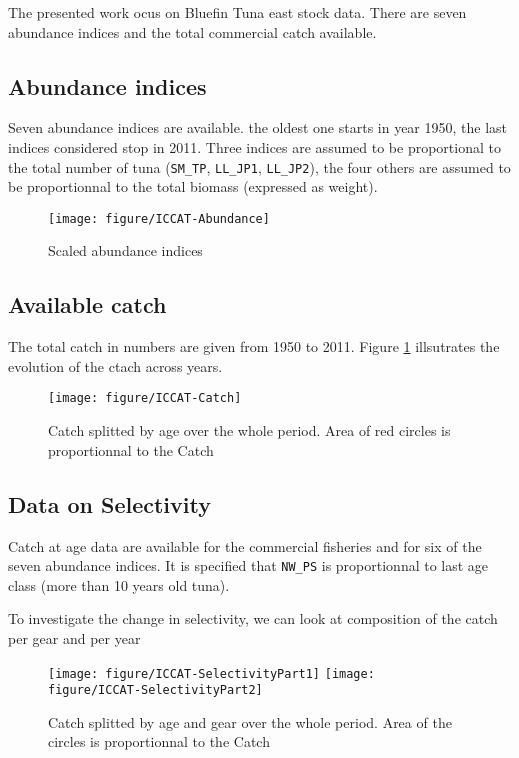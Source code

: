 The presented  work ocus on  Bluefin Tuna  east stock data.  There are
seven abundance indices and the total commercial catch available. 





\subsection{Abundance indices}

Seven abundance indices are available.   the oldest one starts in year
1950,  the last  indices considered  stop in  2011. Three  indices are
assumed to be proportional to  the total number of tuna (\verb+SM_TP+,
\verb+LL_JP1+,  \verb+LL_JP2+),  the four  others  are  assumed to  be
proportionnal to the total biomass (expressed as weight).

\begin{figure}
{\centering \texttt{[image: figure/ICCAT-Abundance]} 
}
\caption{Scaled abundance indices }
\end{figure}




\subsection{Available catch}
The  total catch  in  numbers  are given  from  1950  to 2011.  Figure
\ref{fig:TotCatch} illsutrates the evolution of the ctach across years.
\begin{figure}
\centering \texttt{[image: figure/ICCAT-Catch]} 
\caption{Catch  splitted by  age over  the whole  period. Area  of red
  circles is proportionnal to the Catch}
\label{fig:TotCatch}
\end{figure}


\subsection{Data on Selectivity}
Catch at age  data are available for the commercial  fisheries and for
six of the seven abundance  indices. It is specified that \verb+NW_PS+
is proportionnal to last age class (more than 10 years old tuna).




To investigate the  change in selectivity, we can  look at composition
of the catch per gear and per year
\begin{figure}
{\centering \texttt{[image: figure/ICCAT-SelectivityPart1]} 
}
{\centering \texttt{[image: figure/ICCAT-SelectivityPart2]} 
}
\caption{Catch splitted by age and gear over the whole period. Area of the
  circles is proportionnal to the Catch}
\end{figure}




